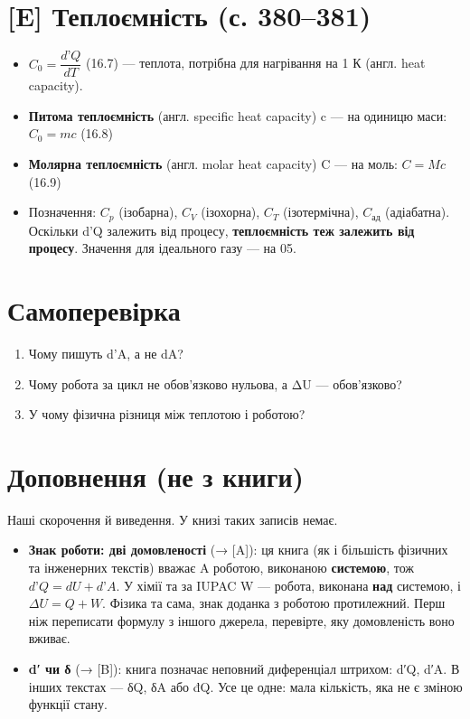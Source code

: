 \documentclass[11pt,a4paper,oneside]{book}
\begin{document}
\section*{[E] Теплоємність (с. 380–381)}
\begin{itemize}
\item $C_0 = \dfrac{d\text{'}Q}{dT}$ (16.7) — теплота, потрібна для нагрівання на 1 К (англ. heat capacity).
\item \textbf{Питома теплоємність} (англ. specific heat capacity) c — на одиницю маси: $C_0 = mc$ (16.8)
\item \textbf{Молярна теплоємність} (англ. molar heat capacity) C — на моль: $C = Mc$ (16.9)
\item Позначення: $C_{p}$ (ізобарна), $C_{V}$ (ізохорна), $C_{T}$ (ізотермічна), $C_{\text{ад}}$ (адіабатна). Оскільки d'Q залежить від процесу, \textbf{теплоємність теж залежить від процесу}. Значення для ідеального газу — на 05.
\end{itemize}

\section*{Самоперевірка}
\begin{enumerate}
\item Чому пишуть d'A, а не dA?
\item Чому робота за цикл не обов'язково нульова, а ΔU — обов'язково?
\item У чому фізична різниця між теплотою і роботою?
\end{enumerate}

\section*{Доповнення (не з книги)}
Наші скорочення й виведення. У книзі таких записів немає.
\begin{itemize}
\item \textbf{Знак роботи: дві домовленості} (→ [A]): ця книга (як і більшість фізичних та інженерних текстів) вважає A роботою, виконаною \textbf{системою}, тож $d\text{'}Q = dU + d\text{'}A$. У хімії та за IUPAC W — робота, виконана \textbf{над} системою, і $\Delta U = Q + W$. Фізика та сама, знак доданка з роботою протилежний. Перш ніж переписати формулу з іншого джерела, перевірте, яку домовленість воно вживає.
\item \textbf{d′ чи δ} (→ [B]): книга позначає неповний диференціал штрихом: d′Q, d′A. В інших текстах — δQ, δA або đQ. Усе це одне: мала кількість, яка не є зміною функції стану.
\end{itemize}
\end{document}
